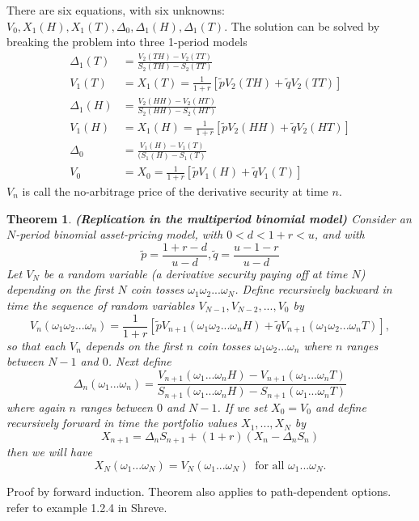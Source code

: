 \documentclass[a4paper]{article}
\newtheorem{thm}{Theorem}
\begin{document}
There are six equations, with six unknowns: $V_0,X_1(H),X_1(T),\Delta_0,\Delta_1(H),\Delta_1(T)$. The solution can be solved by breaking the problem into three 1-period models
\begin{align*}
\Delta_1(T) &= \frac{V_2(TH)-V_2(TT)}{S_2(TH)-S_2(TT)}\\
V_1(T) &= X_1(T) = \frac{1}{1+r}[\tilde{p}V_2(TH)+\tilde{q}V_2(TT)]\\
\Delta_1(H) &= \frac{V_2(HH)-V_2(HT)}{S_2(HH)-S_2(HT)}\\
V_1(H) &= X_1(H) = \frac{1}{1+r}[\tilde{p}V_2(HH)+\tilde{q}V_2(HT)]\\
\Delta_0 &= \frac{V_1(H)-V_1(T)}{(S_1(H)-S_1(T)}\\
V_0 &= X_0 = \frac{1}{1+r}[\tilde{p}V_1(H) + \tilde{q}V_1(T)]
\end{align*}
$V_n$ is call the no-arbitrage price of the derivative security at time $n$. 
\begin{thm}\textbf{(Replication in the multiperiod binomial model)}
Consider an $N$-period binomial asset-pricing model, with $0<d<1+r<u$, and with
$$\tilde{p} = \frac{1+r-d}{u-d}, \tilde{q} = \frac{u-1-r}{u-d}$$
Let $V_N$ be a random variable (a derivative security paying off at time $N$) depending on the first $N$ coin tosses $\omega_1\omega_2...\omega_N$. Define recursively backward in time the sequence of random variables $V_{N-1},V_{N-2},...,V_0$ by 
$$V_n(\omega_1\omega_2...\omega_n)=\frac{1}{1+r}[\tilde{p}V_{n+1}(\omega_1\omega_2...\omega_nH)+\tilde{q}V_{n+1}(\omega_1\omega_2...\omega_nT)],$$ so that each $V_n$ depends on the first $n$ coin tosses $\omega_1\omega_2...\omega_n$ where $n$ ranges between $N-1$ and $0$. Next define
$$\Delta_n(\omega_1...\omega_n)=\frac{V_{n+1}(\omega_1...\omega_nH)-V_{n+1}(\omega_1...\omega_nT)}{S_{n+1}(\omega_1...\omega_nH)-S_{n+1}(\omega_1...\omega_nT)}$$
where again $n$ ranges between $0$ and $N-1$. If we set $X_0=V_0$ and define recursively forward in time the portfolio values $X_1,...,X_N$ by 
$$X_{n+1}=\Delta_nS_{n+1}+(1+r)(X_n-\Delta_n S_n)$$
then we will have 
$$X_N(\omega_1...\omega_N) = V_N(\omega_1...\omega_N) \,\text{ for all }\omega_1...\omega_N.$$
\end{thm}
Proof by forward induction.
Theorem also applies to path-dependent options. refer to example 1.2.4 in Shreve.
\end{document}
